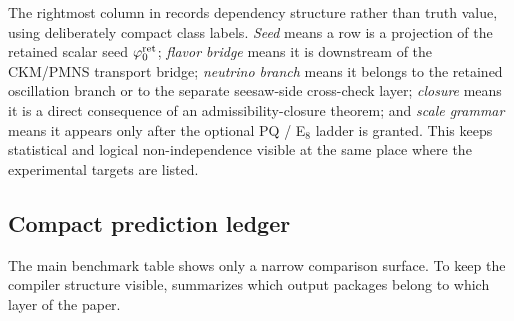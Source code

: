 \begin{table}[t]
{\begin{tabular}
\bottomrule
\end{tabular}}
\caption{Operational prediction set with explicit status and dependency classes.}
\label{tab:operational-prediction-set}
\end{table}

\begin{remark}
The rightmost column in  records dependency structure rather than truth value, using deliberately compact class labels. \emph{Seed} means a row is a projection of the retained scalar seed $\varphi_0^{\mathrm{ret}}$; \emph{flavor bridge} means it is downstream of the CKM/PMNS transport bridge; \emph{neutrino branch} means it belongs to the retained oscillation branch or to the separate seesaw-side cross-check layer; \emph{closure} means it is a direct consequence of an admissibility-closure theorem; and \emph{scale grammar} means it appears only after the optional PQ / E$_8$ ladder is granted. This keeps statistical and logical non-independence visible at the same place where the experimental targets are listed.
\end{remark}

\subsection{Compact prediction ledger}

The main benchmark table shows only a narrow comparison surface. To keep the compiler structure visible,  summarizes which output packages belong to which layer of the paper.

